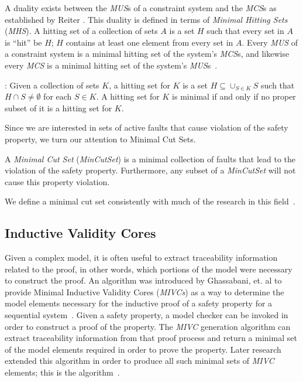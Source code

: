 A duality exists between the \textit{MUS}s of a constraint system and the \textit{MCS}s as established by Reiter \cite{reiter1987theory}. This duality is defined in terms of \textit{Minimal Hitting Sets} (\textit{MHS}). A hitting set of a collection of sets $A$ is a set $H$ such that every set in $A$ is ``hit'' be $H$; $H$ contains at least one element from every set in $A$. Every \textit{MUS} of a constraint system is a minimal hitting set of the system's \textit{MCS}s, and likewise every \textit{MCS} is a minimal hitting set of the system's \textit{MUS}s~\cite{liffiton2016fast, reiter1987theory, de1987diagnosing}.
\begin{definition}: Given a collection of sets $K$, a hitting set for $K$ is a set $H \subseteq \cup_{S \in K} S$ such that $H \cap S \neq \emptyset$ for each $S  \in K$. A hitting set for $K$ is minimal if and only if no proper subset of it is a hitting set for $K$. 
\end{definition}
\noindent
Since we are interested in sets of active faults that cause violation of the safety property, we turn our attention to Minimal Cut Sets. 
\begin{definition}
A \textit{Minimal Cut Set} (\textit{MinCutSet}) is a minimal collection of faults that lead to the violation of the safety property. Furthermore, any subset of a \textit{MinCutSet} will not cause this property violation. 
\end{definition}
\noindent
We define a minimal cut set consistently with much of the research in this field~\cite{0f356f05e72f43018211b36f97c8854a,historyFTA}.\\

\subsection{Inductive Validity Cores}
Given a complex model, it is often useful to extract traceability information related to the proof, in other words, which portions of the model were necessary to construct the proof. An algorithm was introduced by Ghassabani, et. al to provide Minimal Inductive Validity Cores (\textit{MIVCs}) as a way to determine the model elements necessary for the inductive proof of a safety property for a sequential system~\cite{GhassabaniGW16}. Given a safety property, a model checker can be invoked in order to construct a proof of the property. The \textit{MIVC} generation algorithm can extract traceability information from that proof process and return a minimal set of the model elements required in order to prove the property. Later research extended this algorithm in order to produce all such minimal sets of \textit{MIVC} elements; this is the \aivcalg algorithm~\cite{Ghassabani2017EfficientGO,bendik2018online}.


